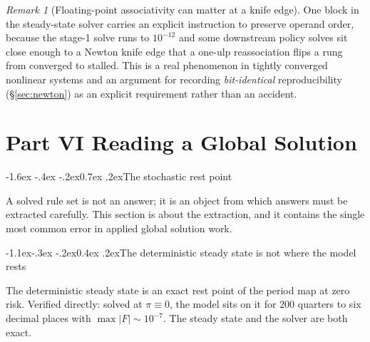\documentclass[10pt,a4paper]{article}
\makeatletter
\theoremstyle{definition}
\theoremstyle{plain}
\theoremstyle{remark}
\newtheorem{rem}[defn]{Remark}
\renewcommand\section{\@startsection{section}{1}{\z@}%
  {-1.6ex \@plus -.4ex \@minus -.2ex}{0.7ex \@plus.2ex}{\normalfont\large\bfseries}}
\renewcommand\subsection{\@startsection{subsection}{2}{\z@}%
  {-1.1ex\@plus -.3ex \@minus -.2ex}{0.4ex \@plus .2ex}{\normalfont\normalsize\bfseries}}
\makeatother
\begin{document}
\begin{rem}[Floating-point associativity can matter at a knife edge]
One block in the steady-state solver carries an explicit instruction to preserve operand
order, because the stage-1 solve runs to $10^{-12}$ and some downstream policy solves sit
close enough to a Newton knife edge that a one-ulp reassociation flips a rung from converged
to stalled. This is a real phenomenon in tightly converged nonlinear systems and an argument
for recording \emph{bit-identical} reproducibility (\S\ref{sec:newton}) as an explicit
requirement rather than an accident.
\end{rem}

\vspace{-4pt}\part*{Part VI \quad Reading a Global Solution}
\section{The stochastic rest point}
\label{sec:reading}

A solved rule set is not an answer; it is an object from which answers must be extracted
carefully. This section is about the extraction, and it contains the single most common error
in applied global solution work.

\subsection{The deterministic steady state is not where the model rests}

The deterministic steady state is an exact rest point of the period map at zero risk. Verified
directly: solved at $\pi\equiv0$, the model sits on it for $200$ quarters to six decimal
places with $\max|F|\sim10^{-7}$. The steady state and the solver are both exact.
\end{document}
